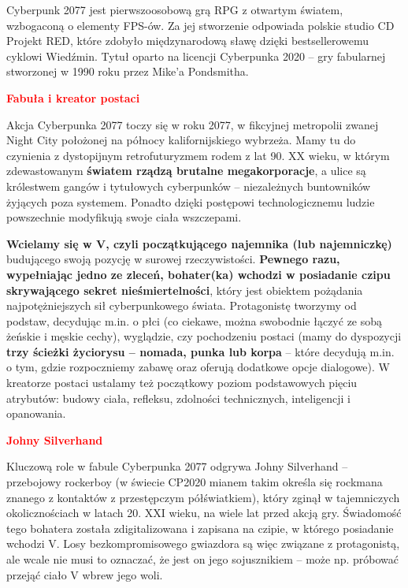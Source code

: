 \documentclass[a4paper]{article}
\begin{document}
Cyberpunk 2077 jest pierwszoosobową grą RPG z otwartym światem, wzbogaconą o elementy FPS-ów. Za jej stworzenie odpowiada polskie studio CD Projekt RED, które zdobyło międzynarodową sławę dzięki bestsellerowemu cyklowi Wiedźmin. Tytuł oparto na licencji Cyberpunka 2020 – gry fabularnej stworzonej w 1990 roku przez Mike’a Pondsmitha.\newline

{\huge\textcolor{red}{\textbf{Fabuła i kreator postaci}}} \newline

Akcja Cyberpunka 2077 toczy się w roku 2077, w fikcyjnej metropolii zwanej Night City położonej na północy kalifornijskiego wybrzeża. Mamy tu do czynienia z dystopijnym retrofuturyzmem rodem z lat 90. XX wieku, w którym zdewastowanym \textbf{światem rządzą brutalne megakorporacje}, a ulice są królestwem gangów i tytułowych cyberpunków – niezależnych buntowników żyjących poza systemem. Ponadto dzięki postępowi technologicznemu ludzie powszechnie modyfikują swoje ciała wszczepami. \newline

\textbf{Wcielamy się w V, czyli początkującego najemnika (lub najemniczkę)} budującego swoją pozycję w surowej rzeczywistości. \textbf{Pewnego razu, wypełniając jedno ze zleceń, bohater(ka) wchodzi w posiadanie czipu skrywającego sekret nieśmiertelności}, który jest obiektem pożądania najpotężniejszych sił cyberpunkowego świata. Protagonistę tworzymy od podstaw, decydując m.in. o płci (co ciekawe, można swobodnie łączyć ze sobą żeńskie i męskie cechy), wyglądzie, czy pochodzeniu postaci (mamy do dyspozycji \textbf{trzy ścieżki życiorysu – nomada, punka lub korpa} – które decydują m.in. o tym, gdzie rozpoczniemy zabawę oraz oferują dodatkowe opcje dialogowe). W kreatorze postaci ustalamy też początkowy poziom podstawowych pięciu atrybutów: budowy ciała, refleksu, zdolności technicznych, inteligencji i opanowania.\newline

{\huge\textcolor{red}{\textbf{Johny Silverhand}}} \newline

Kluczową role w fabule Cyberpunka 2077 odgrywa Johny Silverhand – przebojowy rockerboy (w świecie CP2020 mianem takim określa się rockmana znanego z kontaktów z przestępczym półświatkiem), który zginął w tajemniczych okolicznościach w latach 20. XXI wieku, na wiele lat przed akcją gry. Świadomość tego bohatera została zdigitalizowana i zapisana na czipie, w którego posiadanie wchodzi V. Losy bezkompromisowego gwiazdora są więc związane z protagonistą, ale wcale nie musi to oznaczać, że jest on jego sojusznikiem – może np. próbować przejąć ciało V wbrew jego woli.\newline
\end{document}
